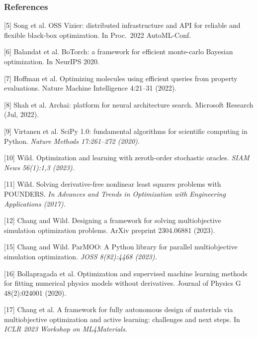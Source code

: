 \documentclass[aspectratio=169]{beamer}
\begin{document}
\begin{frame}\frametitle{References}

{\tiny\it

[5] Song et al.
OSS Vizier: distributed infrastructure and API for reliable and flexible black-box optimization.
In Proc.\ 2022 AutoML-Conf.

\medskip

[6] Balandat et al.
BoTorch: a framework for efficient monte-carlo Bayesian optimization.
In NeurIPS 2020.

\medskip

[7] Hoffman et al.
Optimizing molecules using efficient queries from property evaluations.
Nature Machine Intelligence 4:21--31 (2022).

\medskip

[8] Shah et al.
Archai: platform for neural architecture search.
Microsoft Research (Jul, 2022).

\medskip

[9] Virtanen et al.
SciPy 1.0: fundamental algorithms for scientific computing in Python.
{\sl Nature Methods 17:261--272 (2020).}

\medskip

[10] Wild. Optimization and learning with zeroth-order stochastic oracles.
{\sl SIAM News 56(1):1,3 (2023).}

\medskip

[11] Wild.
Solving derivative-free nonlinear least squares problems with POUNDERS.
{\sl In Advances and Trends in Optimization with Engineering Applications
(2017).}

\medskip

[12]
Chang and Wild.
Designing a framework for solving multiobjective simulation optimization problems.
ArXiv preprint 2304.06881 (2023).

\medskip

[15] Chang and Wild.
ParMOO: A Python library for parallel multiobjective simulation optimization.
{\sl JOSS 8(82):4468 (2023).}

\medskip

[16] Bollapragada et al.
Optimization and supervised machine learning methods for fitting numerical physics models without derivatives.
Journal of Physics G 48(2):024001 (2020).

\medskip

[17] Chang et al.
A framework for fully autonomous design of materials via multiobjective optimization and active learning: challenges and next steps.
In {\sl ICLR 2023 Workshop on ML4Materials}.

}
\end{frame}
\end{document}
